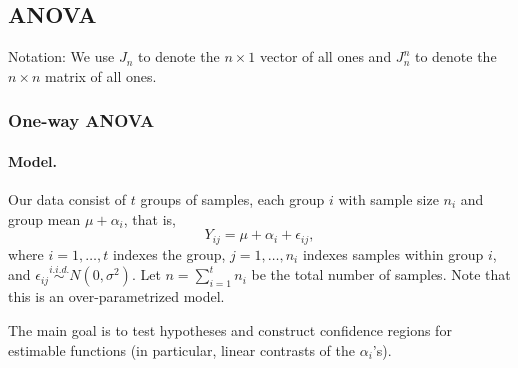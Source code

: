 \documentclass{article}
\theoremstyle{break}
\begin{document}
\subsection{ANOVA}\label{sec:lm-anova}
Notation: We use $J_n$ to denote the $n \times 1$ vector of all ones and $J_n^n$ to denote the $n \times n$ matrix of all ones.


\subsubsection{One-way ANOVA}
\paragraph{Model.}
Our data consist of $t$ groups of samples, each group $i$ with sample size $n_i$ and group mean $\mu + \alpha_i$, that is,
\begin{equation}\label{eq:ANOVA_one_full}
    Y_{ij} = \mu + \alpha_i + \epsilon_{ij},
\end{equation}
where $i=1,\ldots,t$ indexes the group, $j=1,\ldots,n_i$ indexes samples within group $i$, and $\epsilon_{ij} \stackrel{i.i.d.}{\sim} N(0, \sigma^2)$. Let $n=\sum_{i=1}^t n_i$ be the total number of samples. Note that this is an over-parametrized model.

The main goal is to test hypotheses and construct confidence regions for estimable functions (in particular, linear contrasts of the $\alpha_i$'s).
\end{document}
